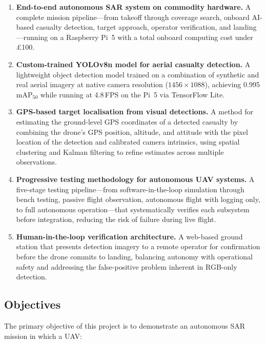 \begin{enumerate}
    \item \textbf{End-to-end autonomous SAR system on commodity hardware.} A complete mission pipeline---from takeoff through coverage search, onboard AI-based casualty detection, target approach, operator verification, and landing---running on a Raspberry Pi~5 with a total onboard computing cost under \pounds{}100.

    \item \textbf{Custom-trained YOLOv8n model for aerial casualty detection.} A lightweight object detection model trained on a combination of synthetic and real aerial imagery at native camera resolution ($1456 \times 1088$), achieving 0.995 mAP$_{50}$ while running at 4.8\,FPS on the Pi~5 via TensorFlow Lite.

    \item \textbf{GPS-based target localisation from visual detections.} A method for estimating the ground-level GPS coordinates of a detected casualty by combining the drone's GPS position, altitude, and attitude with the pixel location of the detection and calibrated camera intrinsics, using spatial clustering and Kalman filtering to refine estimates across multiple observations.

    \item \textbf{Progressive testing methodology for autonomous UAV systems.} A five-stage testing pipeline---from software-in-the-loop simulation through bench testing, passive flight observation, autonomous flight with logging only, to full autonomous operation---that systematically verifies each subsystem before integration, reducing the risk of failure during live flight.

    \item \textbf{Human-in-the-loop verification architecture.} A web-based ground station that presents detection imagery to a remote operator for confirmation before the drone commits to landing, balancing autonomy with operational safety and addressing the false-positive problem inherent in RGB-only detection.
\end{enumerate}

\subsection{Objectives}\label{sec:objectives}

The primary objective of this project is to demonstrate an autonomous SAR mission in which a UAV:

